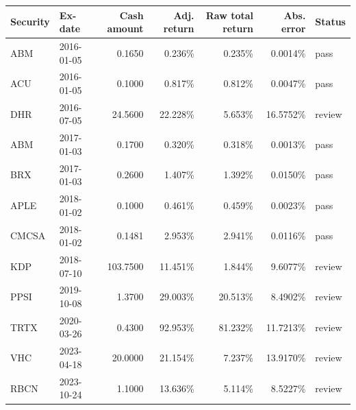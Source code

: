 \begin{tabular}{@{}llrrrrl@{}}
\toprule
Security & Ex-date & Cash amount & Adj. return & Raw total return & Abs. error & Status \\
\midrule
ABM & 2016-01-05 & 0.1650 & 0.236\% & 0.235\% & 0.0014\% & pass \\
ACU & 2016-01-05 & 0.1000 & 0.817\% & 0.812\% & 0.0047\% & pass \\
DHR & 2016-07-05 & 24.5600 & 22.228\% & 5.653\% & 16.5752\% & review \\
ABM & 2017-01-03 & 0.1700 & 0.320\% & 0.318\% & 0.0013\% & pass \\
BRX & 2017-01-03 & 0.2600 & 1.407\% & 1.392\% & 0.0150\% & pass \\
APLE & 2018-01-02 & 0.1000 & 0.461\% & 0.459\% & 0.0023\% & pass \\
CMCSA & 2018-01-02 & 0.1481 & 2.953\% & 2.941\% & 0.0116\% & pass \\
KDP & 2018-07-10 & 103.7500 & 11.451\% & 1.844\% & 9.6077\% & review \\
PPSI & 2019-10-08 & 1.3700 & 29.003\% & 20.513\% & 8.4902\% & review \\
TRTX & 2020-03-26 & 0.4300 & 92.953\% & 81.232\% & 11.7213\% & review \\
VHC & 2023-04-18 & 20.0000 & 21.154\% & 7.237\% & 13.9170\% & review \\
RBCN & 2023-10-24 & 1.1000 & 13.636\% & 5.114\% & 8.5227\% & review \\
\bottomrule
\end{tabular}
